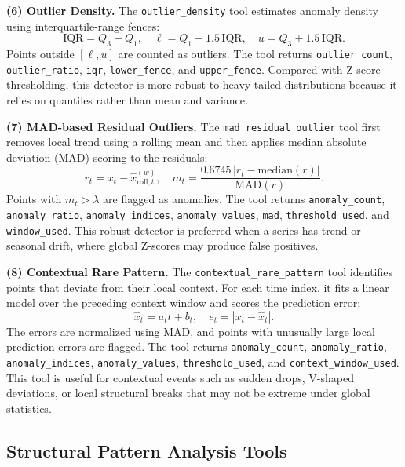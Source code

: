 \documentclass{article}
\begin{document}
\textbf{(6) Outlier Density.}
The \texttt{outlier\_density} tool estimates anomaly density using interquartile-range fences:
\begin{equation}
\mathrm{IQR} = Q_3 - Q_1,\quad
\ell = Q_1 - 1.5\,\mathrm{IQR},\quad
u = Q_3 + 1.5\,\mathrm{IQR}.
\end{equation}
Points outside $[\ell,u]$ are counted as outliers. The tool returns \texttt{outlier\_count}, \texttt{outlier\_ratio}, \texttt{iqr}, \texttt{lower\_fence}, and \texttt{upper\_fence}. Compared with Z-score thresholding, this detector is more robust to heavy-tailed distributions because it relies on quantiles rather than mean and variance.

\textbf{(7) MAD-based Residual Outliers.}
The \texttt{mad\_residual\_outlier} tool first removes local trend using a rolling mean and then applies median absolute deviation (MAD) scoring to the residuals:
\begin{equation}
r_t = x_t - \hat{x}_{\mathrm{roll},t}^{(w)}, \quad
m_t = \frac{0.6745\,|r_t - \mathrm{median}(r)|}{\mathrm{MAD}(r)}.
\end{equation}
Points with $m_t > \lambda$ are flagged as anomalies. The tool returns \texttt{anomaly\_count}, \texttt{anomaly\_ratio}, \texttt{anomaly\_indices}, \texttt{anomaly\_values}, \texttt{mad}, \texttt{threshold\_used}, and \texttt{window\_used}. This robust detector is preferred when a series has trend or seasonal drift, where global Z-scores may produce false positives.

\textbf{(8) Contextual Rare Pattern.}
The \texttt{contextual\_rare\_pattern} tool identifies points that deviate from their local context. For each time index, it fits a linear model over the preceding context window and scores the prediction error:
\begin{equation}
\hat{x}_t = a_t t + b_t,\quad
e_t = |x_t - \hat{x}_t|.
\end{equation}
The errors are normalized using MAD, and points with unusually large local prediction errors are flagged. The tool returns \texttt{anomaly\_count}, \texttt{anomaly\_ratio}, \texttt{anomaly\_indices}, \texttt{anomaly\_values}, \texttt{threshold\_used}, and \texttt{context\_window\_used}. This tool is useful for contextual events such as sudden drops, V-shaped deviations, or local structural breaks that may not be extreme under global statistics.

\subsection{Structural Pattern Analysis Tools}
\end{document}
